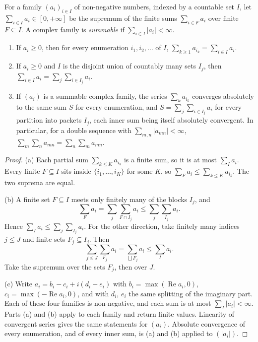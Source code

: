 For a family $(a_i)_{i\in I}$ of non-negative numbers, indexed by a countable set $I$, let $\sum_{i\in I}a_i\in[0,+\infty]$ be the
supremum of the finite sums $\sum_{i\in F}a_i$ over finite $F\subseteq I$. A complex family is \emph{summable} if
$\sum_{i\in I}|a_i|<\infty$.

\begin{lemma}\label{lem:packets}
\begin{enumerate}[label=(\alph*)]
\item If $a_i\ge0$, then for every enumeration $i_1,i_2,\dots$ of $I$, $\sum_{k\ge1}a_{i_k}=\sum_{i\in I}a_i$.
\item If $a_i\ge0$ and $I$ is the disjoint union of countably many sets $I_j$, then $\sum_{i\in I}a_i=\sum_j\sum_{i\in I_j}a_i$.
\item If $(a_i)$ is a summable complex family, the series $\sum_ka_{i_k}$ converges absolutely to the same sum $S$ for every
enumeration, and $S=\sum_j\sum_{i\in I_j}a_i$ for every partition into packets $I_j$, each inner sum being itself absolutely convergent.
In particular, for a double sequence with $\sum_{m,n}|a_{mn}|<\infty$, $\sum_m\sum_na_{mn}=\sum_n\sum_ma_{mn}$.
\end{enumerate}
\end{lemma}
\begin{proof}
(a) Each partial sum $\sum_{k\le K}a_{i_k}$ is a finite sum, so it is at most $\sum_Ia_i$. Every finite $F\subseteq I$ sits inside $\{i_1,\dots,i_K\}$ for some $K$, so $\sum_Fa_i\le\sum_{k\le K}a_{i_k}$. The two suprema are equal.

(b) A finite set $F\subseteq I$ meets only finitely many of the blocks $I_j$, and
\[
\sum_Fa_i=\sum_j\sum_{F\cap I_j}a_i\le\sum_j\sum_{I_j}a_i.
\]
Hence $\sum_Ia_i\le\sum_j\sum_{I_j}a_i$. For the other direction, take finitely many indices $j\le J$ and finite sets $F_j\subseteq I_j$. Then
\[
\sum_{j\le J}\sum_{F_j}a_i=\sum_{\bigcup F_j}a_i\le\sum_Ia_i.
\]
Take the supremum over the sets $F_j$, then over $J$.

(c) Write $a_i=b_i-c_i+i(d_i-e_i)$ with $b_i=\max(\operatorname{Re}a_i,0)$, $c_i=\max(-\operatorname{Re}a_i,0)$, and with $d_i$, $e_i$ the same splitting of the imaginary part. Each of these four families is non-negative, and each sum is at most $\sum_I|a_i|<\infty$. Parts (a) and (b) apply to each family and return finite values. Linearity of convergent series gives the same statements for $(a_i)$. Absolute convergence of every enumeration, and of every inner sum, is (a) and (b) applied to $(|a_i|)$.
\end{proof}

